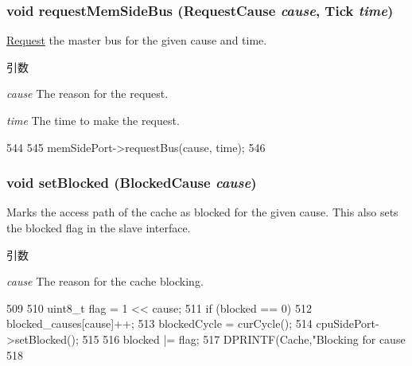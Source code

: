 \hypertarget{classBaseCache_af0bf3b9e90ffddfd7762af4c5fd5247b}{
\subsubsection[{requestMemSideBus}]{\setlength{\rightskip}{0pt plus 5cm}void requestMemSideBus ({\bf RequestCause} {\em cause}, \/  {\bf Tick} {\em time})}}
\label{classBaseCache_af0bf3b9e90ffddfd7762af4c5fd5247b}
\hyperlink{classRequest}{Request} the master bus for the given cause and time. 
\begin{DoxyParams}{引数}
\item[{\em cause}]The reason for the request. \item[{\em time}]The time to make the request. \end{DoxyParams}



\begin{DoxyCode}
544     {
545         memSidePort->requestBus(cause, time);
546     }
\end{DoxyCode}
\hypertarget{classBaseCache_a79de24f2f3eda2cc3ac13f600d171bc0}{
\subsubsection[{setBlocked}]{\setlength{\rightskip}{0pt plus 5cm}void setBlocked ({\bf BlockedCause} {\em cause})}}
\label{classBaseCache_a79de24f2f3eda2cc3ac13f600d171bc0}
Marks the access path of the cache as blocked for the given cause. This also sets the blocked flag in the slave interface. 
\begin{DoxyParams}{引数}
\item[{\em cause}]The reason for the cache blocking. \end{DoxyParams}



\begin{DoxyCode}
509     {
510         uint8_t flag = 1 << cause;
511         if (blocked == 0) {
512             blocked_causes[cause]++;
513             blockedCycle = curCycle();
514             cpuSidePort->setBlocked();
515         }
516         blocked |= flag;
517         DPRINTF(Cache,"Blocking for cause %
518     }
\end{DoxyCode}


